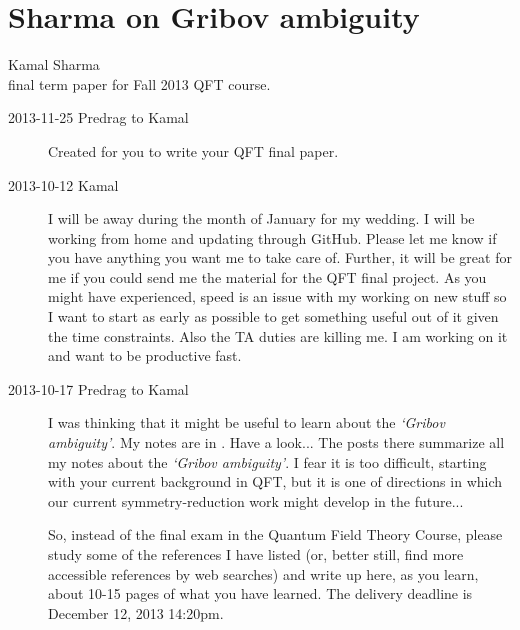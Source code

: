 
\section{Sharma on Gribov ambiguity}
\label{c-dailyBlogKS}

\noindent
Kamal Sharma\\final term paper for Fall 2013 QFT course.
\\

\begin{description}
\item[2013-11-25  Predrag to Kamal] Created  for
    you to write your QFT final paper.

\item[2013-10-12  Kamal] I will be away during the month of January
    for my wedding. I will be working from home and updating through
    GitHub. Please let me know if you have anything you want me to
    take care of. Further, it will be great for me if you could send
    me the material for the QFT final project. As you might have
    experienced, speed is an issue with my working on new stuff so I
    want to start as early as possible to get something useful out of
    it given the time constraints. Also the TA duties are killing me.
    I am working on it and want to be productive fast.

\item[2013-10-17 Predrag to Kamal] I was thinking that it might be
    useful to learn about the \emph{`Gribov ambiguity'}. My notes are
    in . Have a look... The posts there summarize
    all my notes about the \emph{`Gribov ambiguity'}. I fear it is
    too difficult, starting with your current background in QFT, but
    it is one of directions in which our current symmetry-reduction
    work might develop in the future...

So, instead of the final exam in the Quantum Field Theory Course,
please study some of the references I have listed (or, better still,
find more accessible references by web searches) and write up here,
as you learn, about 10-15 pages of what you have learned. The
delivery deadline is  December 12, 2013 14:20pm.


\end{description}


